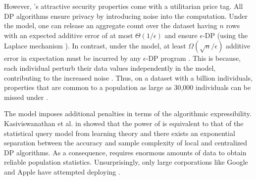 However, \ldp's attractive security properties come with a utilitarian price tag. All DP algorithms ensure privacy by introducing noise into the computation. Under the \cdp model, one can release an aggregate count over the dataset having $n$ rows with an expected additive error of at most $\Theta(1/\epsilon)$ and ensure $\epsilon$-DP (using the Laplace mechanism \cite{dwork}). In contrast, under the \ldp model, at least $\Omega(\sqrt{n}/\epsilon)$ additive error in expectation must be incurred by any $\epsilon$-DP program \cite{error1,error2,error3}. This is because, each individual perturb their data values independently in the \ldp model, contributing to the increased noise \cite{Prochlo,Rappor1,Rappor2,LDP1}. Thus, on a dataset with a billion individuals, properties that are common to a population as large as 30,000 individuals can be missed under \ldp. 

The \ldp model imposes additional penalties in terms of the  algorithmic expressibility.  Kasiviswanathan et al. in \cite{Kasivi} showed that the power of \ldp is equivalent to that of the statistical query model \cite{SQ1} from learning theory and there exists an exponential separation between the accuracy and sample complexity of local and centralized DP algorithms.  As a consequence, \ldp requires enormous amounts of data to obtain reliable population statistics. Unsurprisingly, only large corporations  like Google \cite{Rappor1,Rappor2,Prochlo} and Apple \cite{Apple} have attempted deploying \ldp.
 
